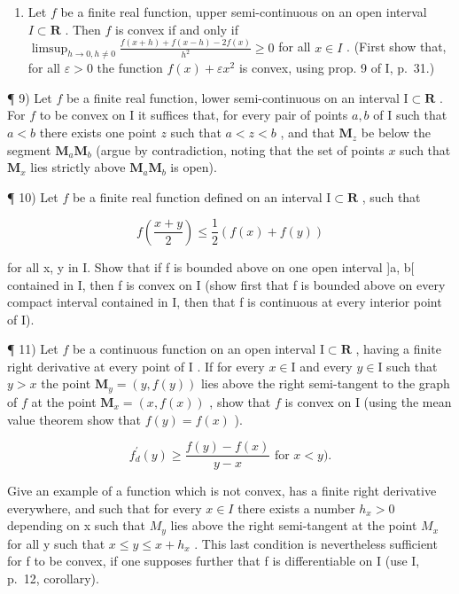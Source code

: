 \begin{enumerate}
\def\labelenumi{\arabic{enumi})}
\setcounter{enumi}{7}
\tightlist
\item
  Let \(f\) be a finite real function, upper semi-continuous on an open interval \(I \subset \mathbf{R}\) . Then \(f\) is convex if and only if \(\limsup_{h \to 0, h \neq 0} \frac{f(x + h) + f(x - h) - 2f(x)}{h^2} \geqslant 0\) for all \(x \in I\) . (First show that, for all \(\varepsilon > 0\) the function \(f(x) + \varepsilon x^2\) is convex, using prop. 9 of I, p.~31.)
\end{enumerate}

¶ 9) Let \(f\) be a finite real function, lower semi-continuous on an interval \(\mathrm{I} \subset \mathbf{R}\) . For \(f\) to be convex on \(\mathrm{I}\) it suffices that, for every pair of points \(a, b\) of \(\mathrm{I}\) such that \(a < b\) there exists one point \(z\) such that \(a < z < b\) , and that \(\mathbf{M}_z\) be below the segment \(\mathbf{M}_a\mathbf{M}_b\) (argue by contradiction, noting that the set of points \(x\) such that \(\mathbf{M}_x\) lies strictly above \(\mathbf{M}_a\mathbf{M}_b\) is open).

¶ 10) Let \(f\) be a finite real function defined on an interval \(\mathrm{I}\subset \mathbf{R}\) , such that

\[
f \left(\frac {x + y}{2}\right) \leqslant \frac {1}{2} (f (x) + f (y))
\]

for all x, y in I. Show that if f is bounded above on one open interval {]}a, b{[} contained in I, then f is convex on I (show first that f is bounded above on every compact interval contained in I, then that f is continuous at every interior point of I).

¶ 11) Let \(f\) be a continuous function on an open interval \(\mathrm{I} \subset \mathbf{R}\) , having a finite right derivative at every point of \(\mathrm{I}\) . If for every \(x \in \mathrm{I}\) and every \(y \in \mathrm{I}\) such that \(y > x\) the point \(\mathbf{M}_y = (y, f(y))\) lies above the right semi-tangent to the graph of \(f\) at the point \(\mathbf{M}_x = (x, f(x))\) , show that \(f\) is convex on \(\mathrm{I}\) (using the mean value theorem show that \(f(y) = f(x)\) ).

\[
f _ {d} ^ {\prime} (y) \geqslant \frac {f (y) - f (x)}{y - x} \text {   for   } x <   y).
\]

Give an example of a function which is not convex, has a finite right derivative everywhere, and such that for every \(x \in I\) there exists a number \(h_{x} > 0\) depending on x such that \(M_{y}\) lies above the right semi-tangent at the point \(M_{x}\) for all y such that \(x \leqslant y \leqslant x + h_{x}\) . This last condition is nevertheless sufficient for f to be convex, if one supposes further that f is differentiable on I (use I, p.~12, corollary).


